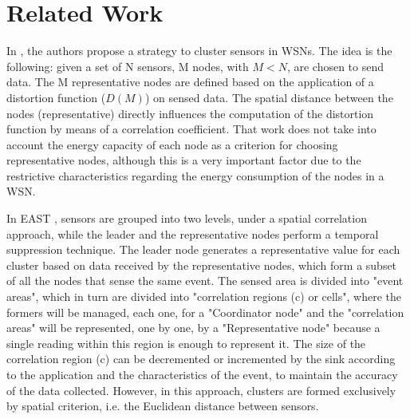 \documentclass[conference]{IEEEtran}
\begin{document}
\section{Related Work}
\label{related-work}

In \cite{Vuran2004}, the authors propose a strategy to cluster sensors in WSNs.
The idea is the following: given a set of N sensors, M nodes, with $M < N$, are
chosen to send data. The M representative nodes are defined based on the
application of a distortion function ($D(M)$) on sensed data.
The spatial distance between the nodes (representative) directly influences the
computation of the distortion function by means of a correlation coefficient.
That work does not take into account the energy capacity of each node as a
criterion for choosing representative nodes, although this is a very important
factor due to the restrictive characteristics regarding the energy consumption
of the nodes in a WSN.

In EAST \cite{Villas2012}, sensors are grouped into two levels, under a spatial
correlation approach, while the leader and the representative nodes perform a
temporal suppression technique.
The leader node generates a representative value for each cluster based on data
received by the representative nodes, which form a subset of all the nodes that
sense the same event. The sensed area is divided into "event areas", which in
turn are divided into "correlation regions (c) or cells", where the formers will
be managed, each one, for a "Coordinator node" and the "correlation areas" will
be represented, one by one, by a "Representative node" because a single reading
within this region is enough to represent it.
The size of the correlation region (c) can be decremented or incremented by the
sink according to the application and the characteristics of the event, to
maintain the accuracy of the data collected. However, in this approach, clusters
are formed exclusively by spatial criterion, i.e. the Euclidean distance between
sensors.
\end{document}
